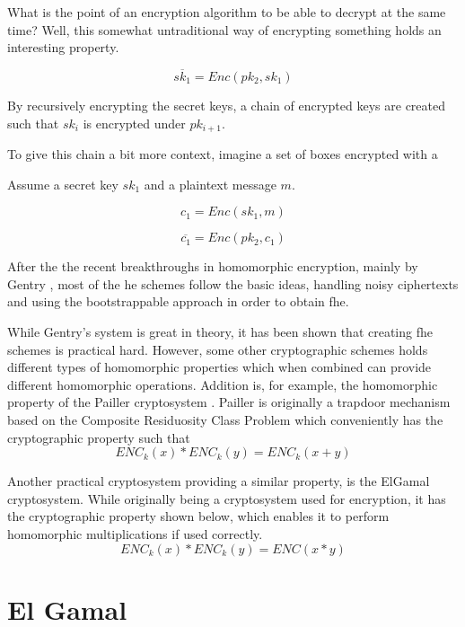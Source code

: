 What is the point of an encryption algorithm to be able to decrypt at the same time? Well, this somewhat untraditional way of encrypting something holds an interesting property.

\[\overline{sk_1} = Enc(pk_2, sk_1)\]





By recursively encrypting the secret keys, a chain of encrypted keys are created such that $sk_i$ is encrypted under $pk_{i+1}$.



To give this chain a bit more context, imagine a set of boxes encrypted with a 





Assume a secret key $sk_1$ and a plaintext message $m$.

\[c_1 = Enc(sk_1, m)\]



\[\overline{c_1} = Enc(pk_2, c_1)\]

After the the recent breakthroughs in homomorphic encryption, mainly by Gentry \citep{Gentry_first_lattices} \citep{Gentry_thesis} \citep{Gentry_computing_arb_func_enc_data}, most of the \gls{he} schemes follow the basic ideas, handling noisy ciphertexts and using the bootstrappable approach in order to obtain \gls{fhe}. 



While Gentry's system is great in theory, it has been shown that creating \gls{fhe} schemes is practical hard. However, some other cryptographic schemes holds different types of homomorphic properties which when combined can provide different homomorphic operations. Addition is, for example, the homomorphic property of the Pailler cryptosystem \citep{Paillier}. Pailler is originally a trapdoor mechanism based on the Composite Residuosity Class Problem which conveniently has the cryptographic property such that \[ENC_k(x) * ENC_k(y) = ENC_k(x + y)\]

Another practical cryptosystem providing a similar property, is the ElGamal cryptosystem. While originally being a cryptosystem used for encryption, it has the cryptographic property shown below, which enables it to perform homomorphic multiplications if used correctly.  \[ENC_k(x) * ENC_k(y) = ENC(x * y)\]

\section{El Gamal}

